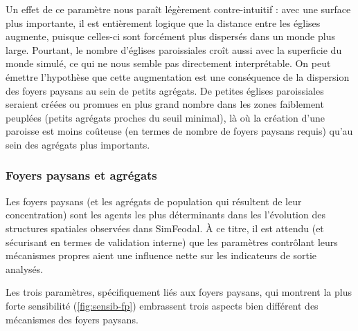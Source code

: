 Un effet de ce paramètre nous paraît légèrement contre-intuitif : avec une surface plus importante, il est entièrement logique que la distance entre les églises augmente, puisque celles-ci sont forcément plus dispersés dans un monde plus large.
Pourtant, le nombre d'églises paroissiales croît aussi avec la superficie du monde simulé, ce qui ne nous semble pas directement interprétable.
On peut émettre l'hypothèse que cette augmentation est une conséquence de la dispersion des foyers paysans au sein de petits agrégats.
De petites églises paroissiales seraient créées ou promues en plus grand nombre dans les zones faiblement peuplées (petits agrégats proches du seuil minimal), là où la création d'une paroisse est moins coûteuse (en termes de nombre de foyers paysans requis) qu'au sein des agrégats plus importants.

\subsubsection{Foyers paysans et agrégats \label{subsubsec:sensib-fp}}

Les foyers paysans (et les agrégats de population qui résultent de leur concentration) sont les agents les plus déterminants dans les l'évolution des structures spatiales observées dans SimFeodal.
À ce titre, il est attendu (et sécurisant en termes de validation interne) que les paramètres contrôlant leurs mécanismes propres aient une influence nette sur les indicateurs de sortie analysés.

Les trois paramètres, spécifiquement liés aux foyers paysans, qui montrent la plus forte sensibilité (\cref{fig:sensib-fp}) embrassent trois aspects bien différent des mécanismes des foyers paysans.

